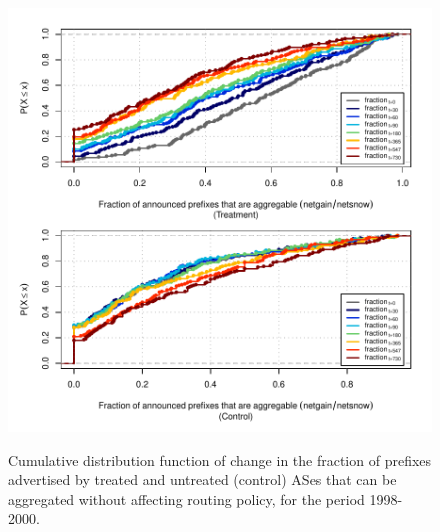 \clearpage
\vspace*{1.25em}
\begin{figure}[H]
\begin{centering}
\begin{singlespace}
\captionsetup{list=no}
    \includegraphics[width=6in]{figures/behavior-frac_deagg-1998_2000-corr.pdf}
    \vspace{-2em}\\
    \caption{Cumulative distribution function of change in the fraction of
    prefixes advertised by treated and untreated (control) ASes that can be
    aggregated without affecting routing policy, for the period 1998-2000.}
\end{singlespace}
\end{centering}
\end{figure}

